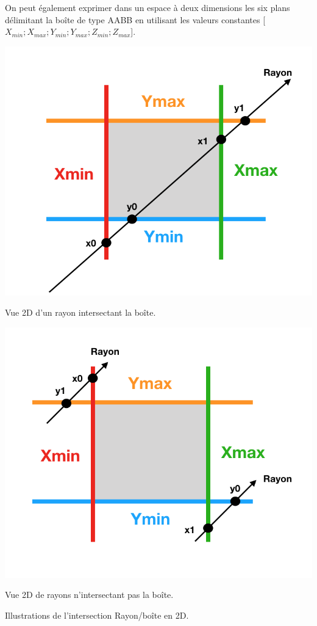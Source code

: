 On peut également exprimer dans un espace à deux dimensions les six plans délimitant la boîte de type \gls{AABB} en utilisant les valeurs constantes [$X_{min} ; X_{max}  ; Y_{min}  ; Y_{max} ; Z_{min} ; Z_{max}$].
%
\begin{figureth}
	\begin{subfigureth}{0.45\textwidth}
		\includegraphics[width=\linewidth]{images/AABB}
		\caption{Vue 2D d'un rayon intersectant la boîte.}
		\label{AABB}
	\end{subfigureth}
	\qquad
	\begin{subfigureth}{0.45\textwidth}
		\includegraphics[width=\linewidth]{images/AABB2}
		\caption{Vue 2D de rayons n'intersectant pas la boîte.}
		\label{AABB2}
	\end{subfigureth}
	\caption{Illustrations de l'intersection Rayon/boîte en 2D.}
\end{figureth}
